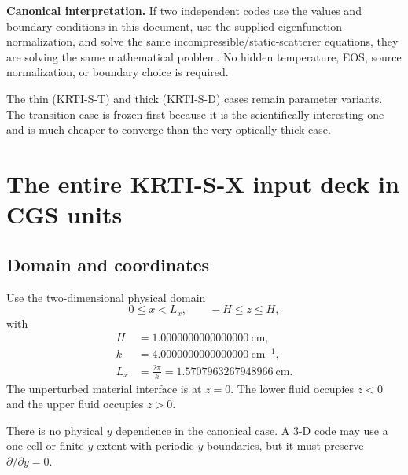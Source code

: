\documentclass[11pt]{article}
\begin{document}
\begin{keybox}
\textbf{Canonical interpretation.} If two independent codes use the values and boundary conditions in this document, use the supplied eigenfunction normalization, and solve the same incompressible/static-scatterer equations, they are solving the same mathematical problem. No hidden temperature, EOS, source normalization, or boundary choice is required.
\end{keybox}

The thin (KRTI-S-T) and thick (KRTI-S-D) cases remain parameter variants. The transition case is frozen first because it is the scientifically interesting one and is much cheaper to converge than the very optically thick case.

\section{The entire KRTI-S-X input deck in CGS units}

\subsection{Domain and coordinates}
Use the two-dimensional physical domain
\begin{equation}
0\le x<L_x,\qquad -H\le z\le H,
\end{equation}
with
\begin{align}
H &= 1.0000000000000000\ \mathrm{cm},\\
k &= 4.0000000000000000\ \mathrm{cm^{-1}},\\
L_x &= \frac{2\pi}{k}=1.5707963267948966\ \mathrm{cm}.
\end{align}
The unperturbed material interface is at $z=0$. The lower fluid occupies $z<0$ and the upper fluid occupies $z>0$.

There is no physical $y$ dependence in the canonical case. A 3-D code may use a one-cell or finite $y$ extent with periodic $y$ boundaries, but it must preserve $\partial/\partial y=0$.
\end{document}
